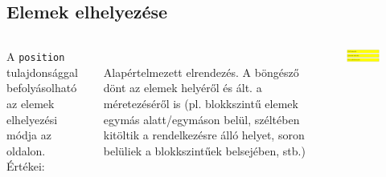 \subsection{Elemek elhelyezése}

\begin{frame}
  \begin{columns}[c]
      A \texttt{position} tulajdonsággal befolyásolható az elemek elhelyezési módja az oldalon. Értékei:
      \begin{description}[m]
        \item[\texttt{static}] \hfill \\ Alapértelmezett elrendezés. A böngésző dönt az elemek helyéről és ált. a méretezéséről is (pl. blokkszintű elemek egymás alatt/egymáson belül, széltében kitöltik a rendelkezésre álló helyet, soron belüliek a blokkszintűek belsejében, stb.)
      \end{description}
      \begin{exampleblock}{}
        \scriptsize
        
        
      \end{exampleblock}
      \begin{center}
        \includegraphics[width=0.5\textwidth]{static.png}
      \end{center}
  \end{columns}
\end{frame}


